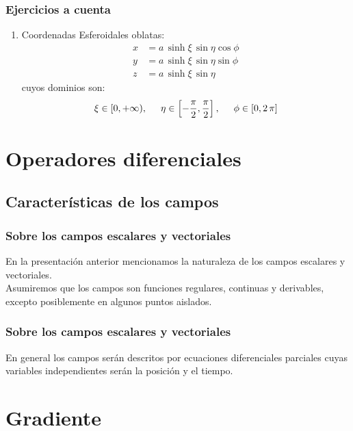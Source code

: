 \documentclass[12pt]{beamer}
\begin{document}
\begin{frame}
\frametitle{Ejercicios a cuenta}
\begin{enumerate}[<+->]
\conti
\item  Coordenadas Esferoidales oblatas:
\begin{align*}
x &= a \, \sinh \xi \, \sin \eta \cos \phi \\[0.5em]
y &= a \, \sinh \xi \, \sin \eta \sin \phi \\[0.5em]
z &= a \, \sinh \xi \, \sin \eta
\end{align*}
cuyos dominios son:
\begin{align*}
\xi \in [0, +\infty), \hspace{0.5cm} \eta \in \left[ - \dfrac{\pi}{2}, \dfrac{\pi}{2} \right], \hspace{0.5cm} \phi \in [0, 2 \, \pi]
\end{align*}
\end{enumerate}
\end{frame}

\section{Operadores diferenciales}
\subsection{Características de los campos}

\begin{frame}
\frametitle{Sobre los campos escalares y vectoriales}
En la presentación anterior mencionamos la naturaleza de los campos escalares y vectoriales.
\\
\bigskip
\pause
Asumiremos que los campos son funciones regulares, continuas y derivables, excepto posiblemente en algunos puntos aislados.
\end{frame}
\begin{frame}
\frametitle{Sobre los campos escalares y vectoriales}
En general los campos serán descritos por ecuaciones diferenciales parciales cuyas variables independientes serán la posición y el tiempo.
\end{frame}

\section{Gradiente}
\end{document}
